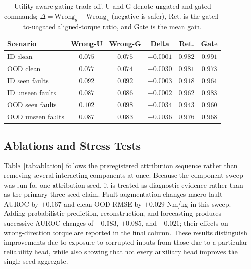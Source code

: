 \documentclass[letterpaper]{article} %
\begin{document}
\begin{table}[t]
\centering
\scriptsize
\setlength{\tabcolsep}{2.5pt}
\begin{tabular}{lccccc}
\toprule
Scenario & Wrong-U & Wrong-G & Delta & Ret. & Gate\\
\midrule
ID clean & $0.075$ & $0.075$ & $-0.0001$ & $0.982$ & $0.991$\\
OOD clean & $0.077$ & $0.074$ & $-0.0030$ & $0.981$ & $0.973$\\
ID seen faults & $0.092$ & $0.092$ & $-0.0003$ & $0.918$ & $0.964$\\
ID unseen faults & $0.087$ & $0.086$ & $-0.0002$ & $0.962$ & $0.983$\\
OOD seen faults & $0.102$ & $0.098$ & $-0.0034$ & $0.943$ & $0.960$\\
OOD unseen faults & $0.087$ & $0.083$ & $-0.0036$ & $0.976$ & $0.968$\\
\bottomrule
\end{tabular}
\caption{Utility-aware gating trade-off. U and G denote ungated and gated commands; $\Delta=\mathrm{Wrong}_g-\mathrm{Wrong}_u$ (negative is safer), Ret. is the gated-to-ungated aligned-torque ratio, and Gate is the mean gain.}
\label{tab:safety}
\end{table}

\subsection{Ablations and Stress Tests}

Table~\ref{tab:ablation} follows the preregistered attribution sequence rather than removing several interacting components at once.
Because the component sweep was run for one attribution seed, it is treated as diagnostic evidence rather than as the primary three-seed claim.
Fault augmentation changes macro fault AUROC by $+0.067$ and clean OOD RMSE by $+0.029$ Nm/kg in this sweep.
Adding probabilistic prediction, reconstruction, and forecasting produces successive AUROC changes of $-0.083$, $+0.085$, and $-0.020$; their effects on wrong-direction torque are reported in the final column.
These results distinguish improvements due to exposure to corrupted inputs from those due to a particular reliability head, while also showing that not every auxiliary head improves the single-seed aggregate.
\end{document}

